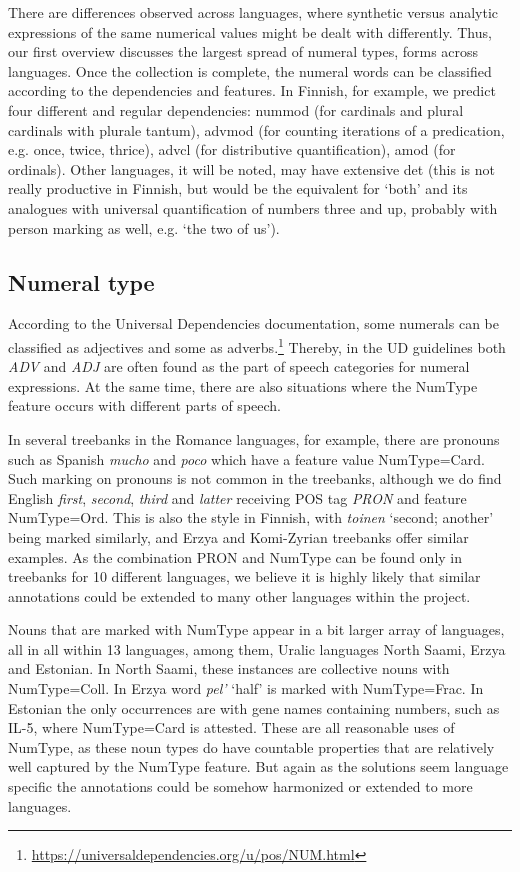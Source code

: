 \documentclass[free]{flammie}
\begin{document}
There are differences observed across languages, where synthetic versus analytic
expressions of the same numerical values might be dealt with differently. Thus,
our first overview discusses the largest spread of numeral types, forms across
languages. Once the collection is complete, the numeral words can be classified
according to the dependencies and features. In Finnish, for example, we predict
four different and regular dependencies: nummod (for cardinals and plural
cardinals with plurale tantum), advmod (for counting iterations of a
predication, e.g. once, twice, thrice), advcl (for distributive quantification),
amod (for ordinals). Other languages, it will be noted, may have extensive det
(this is not really productive in Finnish, but would be the equivalent for
`both' and its analogues with universal quantification of numbers three and up,
probably with person marking as well, e.g. `the two of us').

\subsection{Numeral type}

According to the Universal Dependencies documentation, some numerals can be
classified as adjectives and some as
adverbs.\footnote{\url{https://universaldependencies.org/u/pos/NUM.html}}
Thereby, in the UD guidelines both \textit{ADV} and \textit{ADJ} are often found
as the part of speech categories for numeral expressions. At the same time,
there are also situations where the NumType feature occurs with different parts
of speech.

In several treebanks in the Romance languages, for example, there are pronouns
such as Spanish \textit{mucho} and \textit{poco} which have a feature value
NumType=Card. Such marking on pronouns is not common in the treebanks, although
we do find English \textit{first}, \textit{second}, \textit{third} and
\textit{latter} receiving POS tag \textit{PRON} and feature NumType=Ord. This is
also the style in Finnish, with \textit{toinen} `second; another' being marked
similarly, and Erzya and Komi-Zyrian treebanks offer similar examples. As the
combination PRON and NumType can be found only in treebanks for 10 different
languages, we believe it is highly likely that similar annotations could be
extended to many other languages within the project.

Nouns that are marked with NumType appear in a bit larger array of languages,
all in all within 13 languages, among them, Uralic languages North Saami, Erzya
and Estonian. In North Saami, these instances are collective nouns with
NumType=Coll. In Erzya word \textit{pel'} `half' is marked with NumType=Frac. In
Estonian the only occurrences are with gene names containing numbers, such as
IL-5, where NumType=Card is attested. These are all reasonable uses of NumType,
as these noun types do have countable properties that are relatively well
captured by the NumType feature. But again as the solutions seem language
specific the annotations could be somehow harmonized or extended to more
languages.
\end{document}
